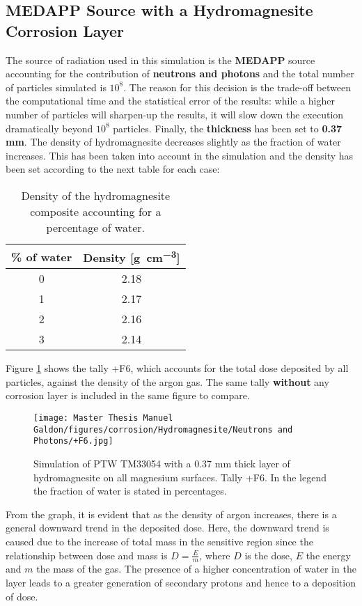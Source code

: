 \subsection{MEDAPP Source with a Hydromagnesite Corrosion Layer}

The source of radiation used in this simulation is the \textbf{MEDAPP} source accounting for the contribution of \textbf{neutrons and photons} and the total number of particles simulated is $10^8$. The reason for this decision is the trade-off between the computational time and the statistical error of the results: while a higher number of particles will sharpen-up the results, it will slow down the execution dramatically beyond $10^8$ particles. Finally, the \textbf{thickness} has been set to \textbf{0.37} \textbf{mm}.
The density of hydromagnesite decreases slightly as the fraction of water increases. This has been taken into account in the simulation and the density has been set according to the next table for each case: 

\begin{table}[!h]
\centering
\begin{tabular}{|c|c|}
\hline
\rowcolor[HTML]{A9D9C6} 
\% of water & Density {[}\unit{\gram\per\cubic\centi\meter}{]} \\ \hline
0           & 2.18                                  \\ \hline
1           & 2.17                               \\ \hline
2           & 2.16                               \\ \hline
3           & 2.14                               \\ \hline
\end{tabular}
\caption{Density of the hydromagnesite composite accounting for a percentage of water.}
\end{table}

Figure \ref{fig:PTW-33053 with hydromagnesite. Tally +F6} shows the tally +F6, which accounts for the total dose deposited by all particles, against the density of the argon gas. The same tally \textbf{without} any corrosion layer is included in the same figure to compare. 

\begin{figure}[!h]
  \centering
  \texttt{[image: Master Thesis Manuel Galdon/figures/corrosion/Hydromagnesite/Neutrons and Photons/+F6.jpg]}
  \caption{Simulation of PTW TM33054 with a 0.37 \unit{\milli\meter} thick layer of hydromagnesite on all magnesium surfaces. Tally +F6. In the legend the fraction of water is stated in percentages.}
  \label{fig:PTW-33053 with hydromagnesite. Tally +F6}
\end{figure}
\newpage
From the graph, it is evident that as the density of argon increases, there is a general downward trend in the deposited dose. Here, the downward trend is caused due to the increase of total mass in the sensitive region since the relationship between dose and mass is $D = \frac{E}{m}$, where $D$ is the dose, $E$ the energy and $m$ the mass of the gas. The presence of a higher concentration of water in the layer leads to a greater generation of secondary protons and hence to a deposition of dose.


